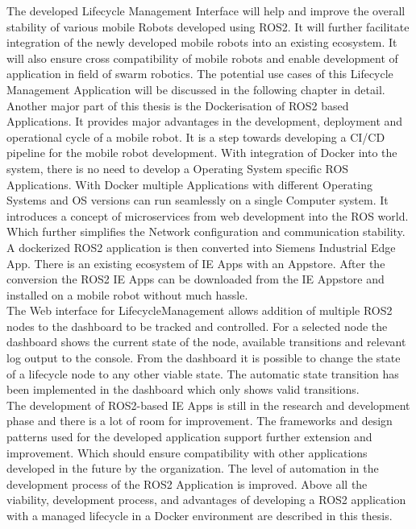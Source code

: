     The developed Lifecycle Management Interface will help and improve the overall stability of various mobile Robots developed using ROS2. It will further facilitate integration of the newly developed mobile robots into an existing ecosystem. It will also ensure cross compatibility of mobile robots and enable development of application in field of swarm robotics. The potential use cases of this Lifecycle Management Application will be discussed in the following chapter in detail.
    \\

    Another major part of this thesis is the Dockerisation of ROS2 based Applications. It provides major advantages in the development, deployment and operational cycle of a mobile robot. It is a step towards developing a CI/CD pipeline for the mobile robot development. With integration of Docker into the system, there is no need to develop a Operating System specific ROS Applications. With Docker multiple Applications with different Operating Systems and OS versions can run seamlessly on a single Computer system. It introduces a concept of microservices from web development into the ROS world. Which further simplifies the Network configuration and communication stability. A dockerized ROS2 application is then converted into Siemens Industrial Edge App. There is an existing ecosystem of IE Apps with an Appstore. After the conversion the ROS2 IE Apps can be downloaded from the IE Appstore and installed on a mobile robot without much hassle. 
    \\
    
    The Web interface for LifecycleManagement allows addition of multiple ROS2 nodes to the dashboard to be tracked and controlled. For a selected node the dashboard shows the current state of the node, available transitions and relevant log output to the console. From the dashboard it is possible to change the state of a lifecycle node to any other viable state. The automatic state transition has been implemented in the dashboard which only shows valid transitions.
    \\

    The development of ROS2-based IE Apps is still in the research and development phase and there is a lot of room for improvement. The frameworks and design patterns used for the developed application support further extension and improvement. Which should ensure compatibility with other applications developed in the future by the organization. The level of automation in the development process of the ROS2 Application is improved. Above all the viability, development process, and advantages of developing a ROS2 application with a managed lifecycle in a Docker environment are described in this thesis. 